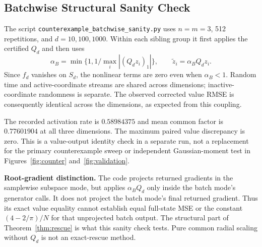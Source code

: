 \subsection{Batchwise Structural Sanity Check}
\label{app:extended-sanity}
The script \texttt{counterexample\_batchwise\_sanity.py} uses $n=m=3$, 512 repetitions, and $d=10,100,1000$. Within each sibling group it first applies the certified $Q_d$ and then uses
\[
 \alpha_B=\min\{1,1/\max_i |(Q_dz_i)_1|\},\qquad
 \widetilde z_i=\alpha_B Q_dz_i.
\]
Since $f_d$ vanishes on $S_d$, the nonlinear terms are zero even when $\alpha_B<1$. Random time and active-coordinate streams are shared across dimensions; inactive-coordinate randomness is separate. The observed corrected value RMSE is consequently identical across the dimensions, as expected from this coupling.



The recorded activation rate is $0.58984375$ and mean common factor is $0.77601904$ at all three dimensions. The maximum paired value discrepancy is zero. This is a value-output identity check in a separate run, not a replacement for the primary counterexample sweep or independent Gaussian-moment test in Figures~\ref{fig:counter} and~\ref{fig:validation}.

\textbf{Root-gradient distinction.} The code projects returned gradients in the samplewise subspace mode, but applies $\alpha_BQ_d$ only inside the batch mode's generator calls. It does not project the batch mode's final returned gradient. Thus its exact value equality cannot establish equal full-state MSE or the constant $(4-2/\pi)/N$ for that unprojected batch output. The structural part of Theorem~\ref{thm:rescue} is what this sanity check tests. Pure common radial scaling without $Q_d$ is not an exact-rescue method.
\FloatBarrier
